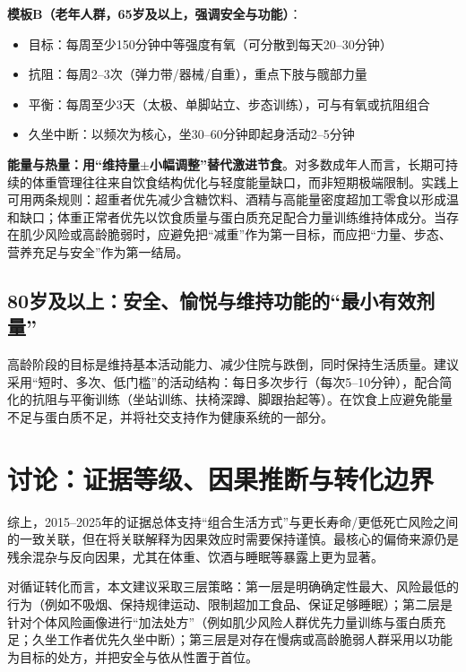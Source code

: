 \documentclass[11pt,a4paper]{article}
\begin{document}
\textbf{模板B（老年人群，65岁及以上，强调安全与功能）}：
\begin{itemize}
  \item 目标：每周至少150分钟中等强度有氧（可分散到每天20--30分钟）\cite{who2020physicalactivity}
  \item 抗阻：每周2--3次（弹力带/器械/自重），重点下肢与髋部力量\cite{internationalexerciserecommendations2021}
  \item 平衡：每周至少3天（太极、单脚站立、步态训练），可与有氧或抗阻组合\cite{internationalexerciserecommendations2021}
  \item 久坐中断：以频次为核心，坐30--60分钟即起身活动2--5分钟\cite{sedentarytimeand2022}
\end{itemize}

\textbf{能量与热量：用“维持量$\pm$小幅调整”替代激进节食}。对多数成年人而言，长期可持续的体重管理往往来自饮食结构优化与轻度能量缺口，而非短期极端限制。实践上可用两条规则：超重者优先减少含糖饮料、酒精与高能量密度超加工零食以形成温和缺口；体重正常者优先以饮食质量与蛋白质充足配合力量训练维持体成分\cite{dga2020,ultraprocessedfood2022}。当存在肌少风险或高龄脆弱时，应避免把“减重”作为第一目标，而应把“力量、步态、营养充足与安全”作为第一结局。

\subsection{80岁及以上：安全、愉悦与维持功能的“最小有效剂量”}

高龄阶段的目标是维持基本活动能力、减少住院与跌倒，同时保持生活质量。建议采用“短时、多次、低门槛”的活动结构：每日多次步行（每次5--10分钟），配合简化的抗阻与平衡训练（坐站训练、扶椅深蹲、脚跟抬起等）。在饮食上应避免能量不足与蛋白质不足，并将社交支持作为健康系统的一部分。\cite{internationalexerciserecommendations2021,associationofloneliness2018}

\section{讨论：证据等级、因果推断与转化边界}

综上，2015--2025年的证据总体支持“组合生活方式”与更长寿命/更低死亡风险之间的一致关联，但在将关联解释为因果效应时需要保持谨慎。最核心的偏倚来源仍是残余混杂与反向因果，尤其在体重、饮酒与睡眠等暴露上更为显著。\cite{commentaryondi2021,alcoholconsumptionand2020}

对循证转化而言，本文建议采取三层策略：第一层是明确确定性最大、风险最低的行为（例如不吸烟、保持规律运动、限制超加工食品、保证足够睡眠）；第二层是针对个体风险画像进行“加法处方”（例如肌少风险人群优先力量训练与蛋白质充足；久坐工作者优先久坐中断）；第三层是对存在慢病或高龄脆弱人群采用以功能为目标的处方，并把安全与依从性置于首位。\cite{internationalexerciserecommendations2021,who2020physicalactivity}
\end{document}
